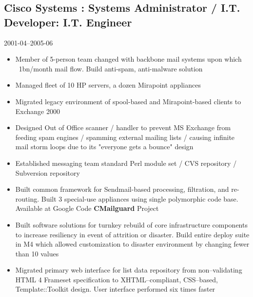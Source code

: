 \documentclass[]{article}
\begin{document}
\subsection*{Cisco Systems : Systems Administrator / I.T. Developer: I.T. Engineer}
  \label{ciscosystems_rdfa_cisco_1_title/_rdfa_cisco_1_titleb:_rdfa_cisco_1_desc}
  2001-04--2005-06
\begin{itemize}
    \item{Member of 5-person team changed with  backbone mail systems upon which ~1bn/month mail flow.  Build anti-spam, anti-malware solution}
    \item{Managed fleet of 10 HP servers, a dozen Mirapoint appliances}
    \item{Migrated legacy environment of spool-based and Mirapoint-based clients to Exchange 2000}
    \item{Designed Out of Office scanner / handler to prevent MS Exchange from feeding spam engines / spamming external mailing lists / causing infinite mail storm loops due to its "everyone gets a bounce" design}
    \item{Established messaging team standard Perl module set / CVS repository / Subversion repository}
    \item{Built common framework for Sendmail-based processing, filtration, and re-routing.  Built 3 special-use appliances using single polymorphic code base.  Available at Google Code {\bf CMailguard} Project}
    \item{Built software solutions for turnkey rebuild of core infrastructure components to increase resiliency in event of attrition or disaster.  Build entire deploy suite in M4 which allowed customization to disaster environment by changing fewer than 10 values}
    \item{Migrated primary web interface for list data repository from non–validating HTML 4 Frameset specification to XHTML–compliant, CSS–based, Template::Toolkit design.  User interface performed six times faster}
\end{itemize}
       
\end{document}
